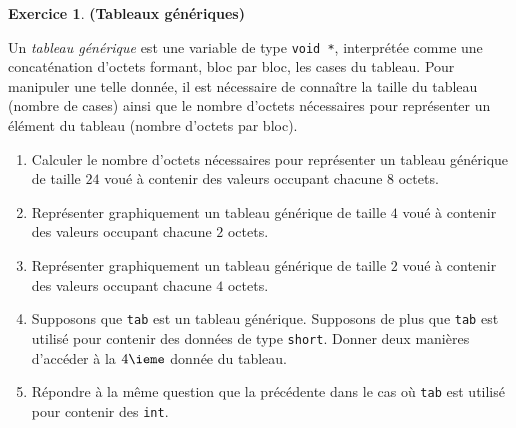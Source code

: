 \documentclass[12pt]{article}
\theoremstyle{definition}
\newtheorem{Exercice}{Exercice}
\begin{document}
\begin{Exercice} {\bf (Tableaux génériques)}\smallskip

Un {\em tableau générique} est une variable de type {\tt void *},
interprétée comme une concaténation d'octets formant, bloc par bloc,
les cases du tableau. Pour manipuler une telle donnée, il est nécessaire
de connaître la taille du tableau (nombre de cases) ainsi que le nombre
d'octets nécessaires pour représenter un élément du tableau (nombre
d'octets par bloc).
\begin{enumerate}
    \item Calculer le nombre d'octets nécessaires pour représenter
    un tableau générique de taille $24$ voué à contenir des valeurs
    occupant chacune $8$ octets.
    \smallskip

    \item Représenter graphiquement un tableau générique de taille $4$
    voué à contenir des valeurs occupant chacune $2$ octets.
    \smallskip

    \item Représenter graphiquement un tableau générique de taille $2$
    voué à contenir des valeurs occupant chacune $4$ octets.
    \smallskip

    \item Supposons que {\tt tab} est un tableau générique. Supposons de
    plus que {\tt tab} est utilisé pour contenir des données de type
    {\tt short}. Donner deux manières d'accéder à la $4\ieme$ donnée du
    tableau.
    \smallskip

    \item Répondre à la même question que la précédente dans le cas où
    {\tt tab} est utilisé pour contenir des {\tt int}.
\end{enumerate}
\end{Exercice}
\bigskip
\end{document}
